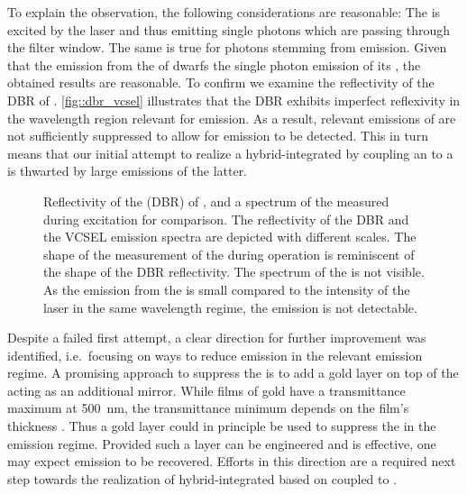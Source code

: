 		To explain the observation, the following considerations are reasonable: The \siv is excited by the \VCSELs laser and thus emitting single photons which are passing through the filter window. The same is true for photons stemming from \VCSEL \sb emission. Given that the emission from the \sb of \BmFour dwarfs the single photon emission of its \siv, the obtained results are reasonable.
		To confirm we examine the reflectivity of the DBR of \BmFour. \autoref{fig::dbr_vcsel} illustrates that the DBR exhibits imperfect reflexivity in the wavelength region relevant for \siv emission. As a result, relevant \sb emissions of \BmFour are not sufficiently suppressed to allow for \siv emission to be detected. This in turn means that our initial attempt to realize a hybrid-integrated \sps by coupling an \siv to a \VCSELs is thwarted by large \sb emissions of the latter.

		\begin{figure}[htp]
			\centering
			\caption[Reflectivity of \BmFour]{Reflectivity of the \dbr (DBR) of \BmFour \cite{Weidenfeld2012}, and a spectrum of the \siv measured during \VCSEL excitation for comparison. The reflectivity of the DBR and the VCSEL emission spectra are depicted with different scales. The shape of the measurement of the \siv during \VCSEL operation is reminiscent of the shape of the DBR reflectivity. The spectrum of the \siv is not visible. As the emission from the \siv is small compared to the intensity of the laser \sb in the same wavelength regime, the \sivs emission is not detectable.}
			\label{fig::dbr_vcsel}
		\end{figure}

		Despite a failed first attempt, a clear direction for further improvement was identified, i.e.\ focusing on ways to reduce \VCSEL \sb emission in the relevant \siv emission regime. A promising approach to suppress the \sb is to add a gold layer on top of the \VCSEL acting as an additional mirror. While films of gold have a transmittance maximum at \SI{500}{nm}, the transmittance minimum depends on the film's thickness \cite{Axelevitch2012}. Thus a gold layer could in principle be used to suppress the \VCSEL \sb in the \siv emission regime. Provided such a layer can be engineered and is effective, one may expect \siv emission to be recovered. Efforts in this direction are a required next step towards the realization of hybrid-integrated \spss based on \sivs coupled to \VCSELs.
